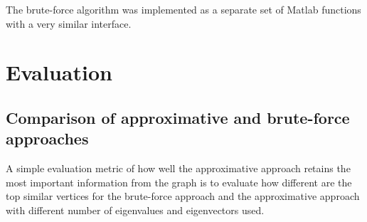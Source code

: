 \documentclass[12pt]{report}
\begin{document}
The brute-force algorithm was implemented as a separate set of Matlab functions
with a very similar interface.


%
%
\section{Evaluation}
\subsection{Comparison of approximative and brute-force approaches}
%
A simple evaluation metric of how well the approximative approach retains the
most important information from the graph is to evaluate how different are the
top similar vertices for the brute-force approach and the approximative approach
with different number of eigenvalues and eigenvectors used.
\end{document}
